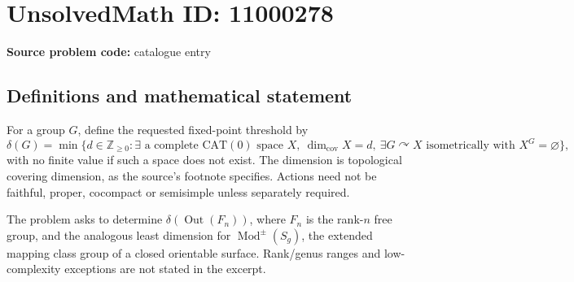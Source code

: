 \documentclass[11pt]{article}
\newcommand{\Z}{\mathbb{Z}}
\begin{document}
\section*{UnsolvedMath ID: 11000278}
\textbf{Source problem code:} catalogue entry
\subsection{Definitions and mathematical statement}
For a group \(G\), define the requested fixed-point threshold by
\[\delta(G)=\min\{d\in\Z_{\geq0}:\exists\text{ a complete CAT}(0)\text{ space }X,
\ \dim_{\mathrm{cov}}X=d,\ \exists G\curvearrowright X\text{ isometrically with }X^G=\varnothing\},\]
with no finite value if such a space does not exist. The dimension is topological covering dimension, as the source's footnote specifies. Actions need not be faithful, proper, cocompact or semisimple unless separately required.

The problem asks to determine \(\delta(\operatorname{Out}(F_n))\), where \(F_n\) is the rank-\(n\) free group, and the analogous least dimension for \(\operatorname{Mod}^{\pm}(S_g)\), the extended mapping class group of a closed orientable surface. Rank/genus ranges and low-complexity exceptions are not stated in the excerpt.
\end{document}
